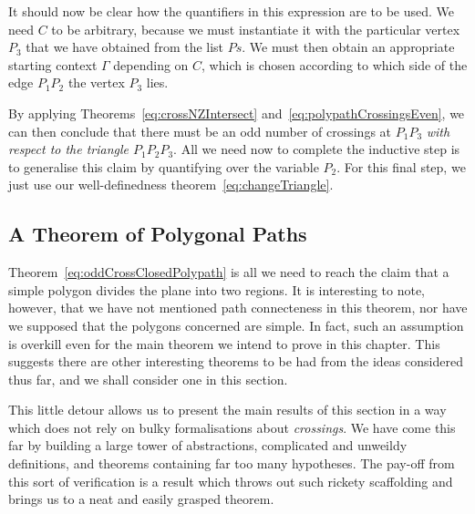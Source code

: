 It should now be clear how the quantifiers in this expression are to be used. We need $C$ to be arbitrary, because we must instantiate it with the particular vertex $P_3$ that we have obtained from the list $Ps$. We must then obtain an appropriate starting context $\Gamma$ depending on $C$, which is chosen according to which side of the edge $P_1P_2$ the vertex $P_3$ lies. 

By applying Theorems~\ref{eq:crossNZIntersect} and~\ref{eq:polypathCrossingsEven}, we can then conclude that there must be an odd number of crossings at $P_1P_3$ \emph{with respect to the triangle $P_1P_2P_3$}. All we need now to complete the inductive step is to generalise this claim by quantifying over the variable $P_2$. For this final step, we just use our well-definedness theorem~\eqref{eq:changeTriangle}.

\subsection{A Theorem of Polygonal Paths}\label{sec:PathTheorem}
Theorem~\ref{eq:oddCrossClosedPolypath} is all we need to reach the claim that a simple polygon divides the plane into two regions. It is interesting to note, however, that we have not mentioned path connecteness in this theorem, nor have we supposed that the polygons concerned are simple. In fact, such an assumption is overkill even for the main theorem we intend to prove in this chapter. This suggests there are other interesting theorems to be had from the ideas considered thus far, and we shall consider one in this section.

This little detour allows us to present the main results of this section in a way which does not rely on bulky formalisations about \emph{crossings}. We have come this far by building a large tower of abstractions, complicated and unweildy definitions, and theorems containing far too many hypotheses. The pay-off from this sort of verification is a result which throws out such rickety scaffolding and brings us to a neat and easily grasped theorem.

